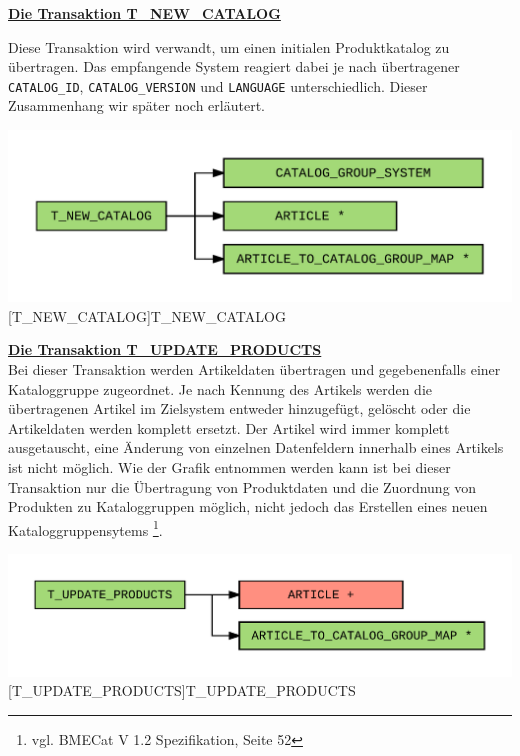 	
	
	\textbf{\underline{Die Transaktion T\_NEW\_CATALOG}}
	
	Diese Transaktion wird verwandt, um einen initialen Produktkatalog zu übertragen. Das empfangende System reagiert dabei je nach übertragener \texttt{CATALOG\_ID}, \texttt{CATALOG\_VERSION}
	und \texttt{LANGUAGE} unterschiedlich. Dieser Zusammenhang wir später noch erläutert. %
	
	
	\begin{minipage}{\linewidth}
		\vspace{1em}
		\centering
		\includegraphics[width=0.65\linewidth]{img/newCatalog}
		[T\_NEW\_CATALOG]{T\_NEW\_CATALOG}
		\label{fig:header}
		\vspace{1em}
	\end{minipage}
	
	\textbf{\underline{Die Transaktion T\_UPDATE\_PRODUCTS}}\\
	
	Bei dieser Transaktion werden Artikeldaten übertragen und gegebenenfalls einer Kataloggruppe zugeordnet. Je nach Kennung des Artikels werden die übertragenen
	Artikel im Zielsystem entweder hinzugefügt, gelöscht oder die Artikeldaten werden komplett ersetzt.
	Der Artikel wird immer komplett ausgetauscht, eine Änderung von einzelnen Datenfeldern innerhalb eines Artikels ist nicht möglich.
	Wie der Grafik entnommen werden kann ist bei dieser Transaktion nur die Übertragung von Produktdaten und die Zuordnung von Produkten zu Kataloggruppen möglich, nicht jedoch das Erstellen eines neuen Kataloggruppensytems \footnote{vgl. BMECat V 1.2 Spezifikation, Seite 52}.
	
	\begin{minipage}{\linewidth}
		\vspace{1em}
		\centering
		\includegraphics[width=0.65\linewidth]{img/updateProducts}
		[T\_UPDATE\_PRODUCTS]{T\_UPDATE\_PRODUCTS}
		\label{fig:header}
		\vspace{1em}
	\end{minipage}
	
